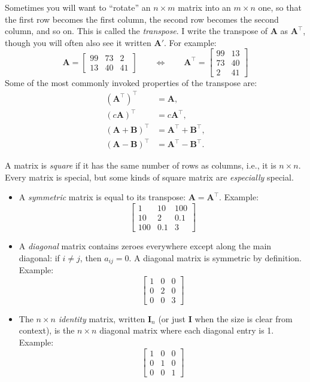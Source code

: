 \documentclass[12pt,oneside,openany]{book}
\begin{document}
Sometimes you will want to ``rotate'' an \(n \times m\) matrix into an
\(m \times n\) one, so that the first row becomes the first column, the
second row becomes the second column, and so on. This is called the
\emph{transpose}. I write the transpose of \(\mathbf{A}\) as
\(\mathbf{A}^\top\), though you will often also see it written
\(\mathbf{A}'\). For example: \[
\mathbf{A}
=
\begin{bmatrix}
  99 & 73 & 2 \\
  13 & 40 & 41
\end{bmatrix}
\qquad
\Leftrightarrow
\qquad
\mathbf{A}^\top =
\begin{bmatrix}
  99 & 13 \\
  73 & 40 \\
  2 & 41
\end{bmatrix}
\] Some of the most commonly invoked properties of the transpose are: \[
\begin{aligned}
(\mathbf{A}^\top)^\top &= \mathbf{A}, \\
(c \mathbf{A})^\top &= c \mathbf{A}^\top, \\
(\mathbf{A} + \mathbf{B})^\top &= \mathbf{A}^\top + \mathbf{B}^\top, \\
(\mathbf{A} - \mathbf{B})^\top &= \mathbf{A}^\top - \mathbf{B}^\top.
\end{aligned}
\]

A matrix is \emph{square} if it has the same number of rows as columns,
i.e., it is \(n \times n\). Every matrix is special, but some kinds of
square matrix are \emph{especially} special.

\begin{itemize}
\item
  A \emph{symmetric} matrix is equal to its transpose:
  \(\mathbf{A} = \mathbf{A}^\top\). Example: \[
  \begin{bmatrix}
    1 & 10 & 100 \\
    10 & 2 & 0.1 \\
    100 & 0.1 & 3
  \end{bmatrix}\]
\item
  A \emph{diagonal} matrix contains zeroes everywhere except along the
  main diagonal: if \(i \neq j\), then \(a_{ij} = 0\). A diagonal matrix
  is symmetric by definition. Example: \[
  \begin{bmatrix}
    1 & 0 & 0 \\
    0 & 2 & 0 \\
    0 & 0 & 3
  \end{bmatrix}\]
\item
  The \(n \times n\) \emph{identity} matrix, written \(\mathbf{I}_n\)
  (or just \(\mathbf{I}\) when the size is clear from context), is the
  \(n \times n\) diagonal matrix where each diagonal entry is 1.
  Example: \[
  \begin{bmatrix}
    1 & 0 & 0 \\
    0 & 1 & 0 \\
    0 & 0 & 1
  \end{bmatrix}\]
\end{itemize}
\end{document}
